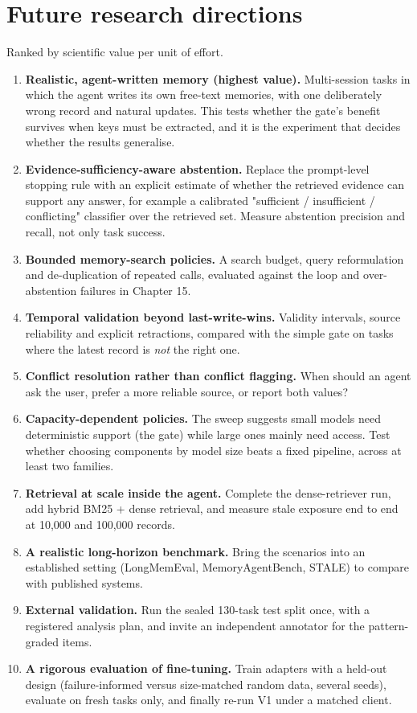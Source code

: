 \documentclass[10.5pt,a4paper,oneside]{report}
\begin{document}
\chapter{Future research directions}
Ranked by scientific value per unit of effort.

\begin{enumerate}
\item \textbf{Realistic, agent-written memory (highest value).} Multi-session tasks in which the agent writes its own free-text memories, with one deliberately wrong record and natural updates. This tests whether the gate's benefit survives when keys must be extracted, and it is the experiment that decides whether the results generalise.
\item \textbf{Evidence-sufficiency-aware abstention.} Replace the prompt-level stopping rule with an explicit estimate of whether the retrieved evidence can support any answer, for example a calibrated "sufficient / insufficient / conflicting" classifier over the retrieved set. Measure abstention precision and recall, not only task success.
\item \textbf{Bounded memory-search policies.} A search budget, query reformulation and de-duplication of repeated calls, evaluated against the loop and over-abstention failures in Chapter 15.
\item \textbf{Temporal validation beyond last-write-wins.} Validity intervals, source reliability and explicit retractions, compared with the simple gate on tasks where the latest record is \emph{not} the right one.
\item \textbf{Conflict resolution rather than conflict flagging.} When should an agent ask the user, prefer a more reliable source, or report both values?
\item \textbf{Capacity-dependent policies.} The sweep suggests small models need deterministic support (the gate) while large ones mainly need access. Test whether choosing components by model size beats a fixed pipeline, across at least two families.
\item \textbf{Retrieval at scale inside the agent.} Complete the dense-retriever run, add hybrid BM25 + dense retrieval, and measure stale exposure end to end at 10,000 and 100,000 records.
\item \textbf{A realistic long-horizon benchmark.} Bring the scenarios into an established setting (LongMemEval, MemoryAgentBench, STALE) to compare with published systems.
\item \textbf{External validation.} Run the sealed 130-task test split once, with a registered analysis plan, and invite an independent annotator for the pattern-graded items.
\item \textbf{A rigorous evaluation of fine-tuning.} Train adapters with a held-out design (failure-informed versus size-matched random data, several seeds), evaluate on fresh tasks only, and finally re-run V1 under a matched client.
\end{enumerate}
\clearpage
\end{document}
